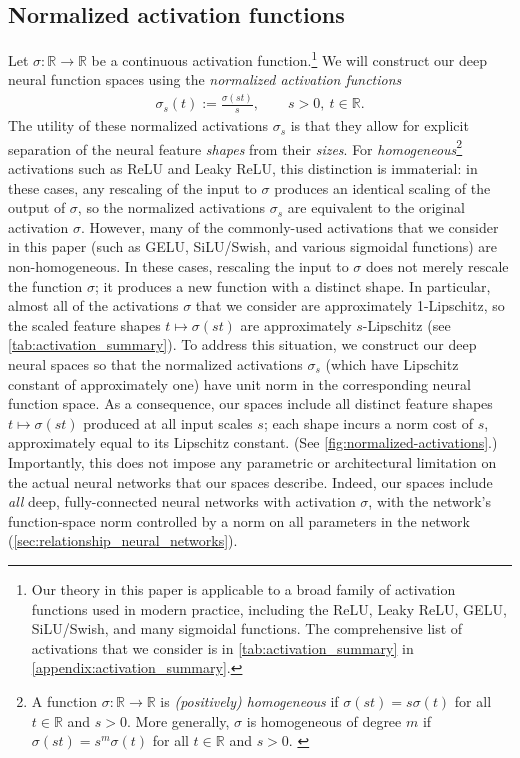 \documentclass{article}
\newcommand{\R}{\mathbb{R}}
\begin{document}
\subsection{Normalized activation functions}
Let $\sigma: \R \to \R$ be a continuous activation function.\footnote{Our theory in this paper is applicable to a broad family of activation functions used in modern practice, including the ReLU, Leaky ReLU, GELU, SiLU/Swish, and many sigmoidal functions. The comprehensive list of activations that we consider is in \cref{tab:activation_summary} in \cref{appendix:activation_summary}.} We will construct our deep neural function spaces using the \textit{normalized activation functions}
\begin{align} \label{eq:normalized_activations}
    \sigma_s(t) := \frac{\sigma(st)}{s}, \qquad s >0, \ t \in \R.
\end{align}
The utility of these normalized activations $\sigma_s$ is that they allow for explicit separation of the neural feature \textit{shapes} from their \textit{sizes}. For \textit{homogeneous}\footnote{A function $\sigma: \R \to \R$ is \textit{(positively) homogeneous} if $\sigma(st) = s\sigma(t)$ for all $t \in \R$ and $s > 0$. More generally, $\sigma$ is homogeneous of degree $m$ if $\sigma(st) = s^m \sigma(t)$ for all $t \in \R$ and $s > 0$. \label{footnote:homogeneous}} activations such as ReLU and Leaky ReLU, this distinction is immaterial: in these cases, any rescaling of the input to $\sigma$ produces an identical scaling of the output of $\sigma$, so the normalized activations $\sigma_s$ are equivalent to the original activation $\sigma$. However, many of the commonly-used activations that we consider in this paper (such as GELU, SiLU/Swish, and various sigmoidal functions) are non-homogeneous. In these cases, rescaling the input to $\sigma$ does not merely rescale the function $\sigma$; it produces a new function with a distinct shape. In particular, almost all of the activations $\sigma$ that we consider are approximately 1-Lipschitz, so the scaled feature shapes $t \mapsto \sigma(st)$ are approximately $s$-Lipschitz (see \cref{tab:activation_summary}). To address this situation, we construct our deep neural spaces so that the normalized activations $\sigma_s$ (which have Lipschitz constant of approximately one) have unit norm in the corresponding neural function space. As a consequence, our spaces include all distinct feature shapes $t \mapsto \sigma(st)$ produced at all input scales $s$; each shape incurs a norm cost of $s$, approximately equal to its Lipschitz constant. (See \cref{fig:normalized-activations}.) Importantly, this does not impose any parametric or architectural limitation on the actual neural networks that our spaces describe. Indeed, our spaces include \textit{all} deep, fully-connected neural networks with activation $\sigma$, with the network's function-space norm controlled by a norm on all parameters in the network (\cref{sec:relationship_neural_networks}).
\end{document}
